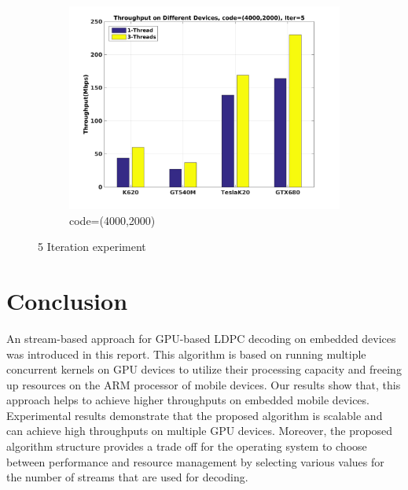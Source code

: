 \documentclass[10pt,a4paper]{article}
\begin{document}
\begin{figure}[H]
\begin{subfigure}[b]{0.7\textwidth}
    \includegraphics[width=\textwidth]{c_4k_5.jpg}
    \caption{code=(4000,2000)}
    \label{fig:throu_5_c}
  \end{subfigure}
  \caption{5 Iteration experiment}\label{fig:5iter}
\end{figure}

\section{Conclusion}
An stream-based approach for GPU-based LDPC decoding on embedded devices was introduced in this report. This algorithm is based on running multiple concurrent kernels on GPU devices to utilize their processing capacity and freeing up resources on the ARM processor of mobile devices. Our results show that, this approach helps to achieve higher throughputs on embedded mobile devices. Experimental results demonstrate that the proposed algorithm is scalable and can achieve high throughputs on multiple GPU devices. Moreover, the proposed algorithm structure provides a trade off for the operating system to choose between performance and resource management by selecting various values for the number of streams that are used for decoding.

\newpage



\end{document}
